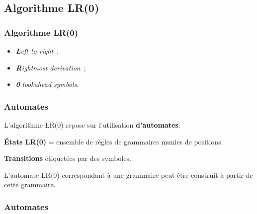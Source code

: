 \subsection{Algorithme LR(0)}

\begin{frame}
    \frametitle{Algorithme LR(0)}

    \begin{itemize}
        \item \textit{\textbf{L}eft to right}~;
        \item \textit{\textbf{R}ightmost derivation}~;
        \item \textit{\textbf{0} lookahead symbols}.
    \end{itemize}
\end{frame}

\begin{frame}
    \frametitle{Automates}

    \pause
    L’algorithme LR(0) repose sur l’utilisation \textbf{d’automates}.

    \pause
    \begin{definition}
        \textbf{États LR(0)} = ensemble de règles de grammaires munies de
        positions.

        \textbf{Transitions} étiquetées par des symboles.
    \end{definition}

    \pause
    L’automate LR(0) correspondant à une grammaire peut être construit à partir
    de cette grammaire.
\end{frame}

\begin{frame}
    \frametitle{Automates}

    \begin{minipage}{0.3\textwidth}
    
    \end{minipage}%
    \begin{minipage}{0.7\textwidth}
        \begin{center}
        \maxsizebox{\textwidth}{0.8\textheight}{
            
        }
        \end{center}
    \end{minipage}
\end{frame}

